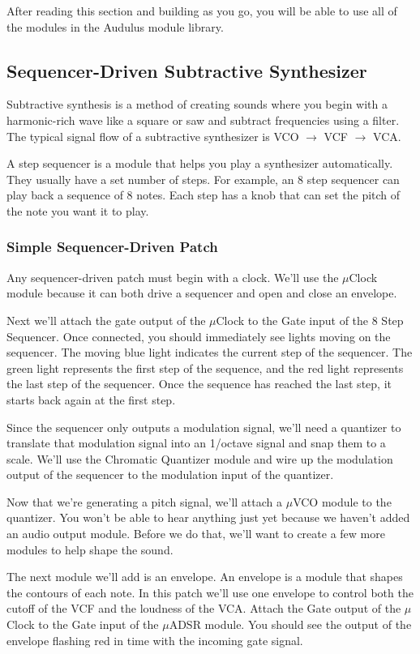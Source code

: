 \documentclass[11pt]{book}
\begin{document}
\begin{multicols*}{2}
After reading this section and building as you go, you will be able to use all of the modules in the Audulus module library. 

\subsection{Sequencer-Driven Subtractive Synthesizer}

Subtractive synthesis is a method of creating sounds where you begin with a harmonic-rich wave like a square or saw and subtract frequencies using a filter. The typical signal flow of a subtractive synthesizer is VCO $\rightarrow$ VCF $\rightarrow$ VCA.

A step sequencer is a module that helps you play a synthesizer automatically. They usually have a set number of steps. For example, an 8 step sequencer can play back a sequence of 8 notes. Each step has a knob that can set the pitch of the note you want it to play. 

\subsubsection{Simple Sequencer-Driven Patch}

Any sequencer-driven patch must begin with a clock. We'll use the $\mu$Clock module because it can both drive a sequencer and open and close an envelope.

Next we'll attach the gate output of the $\mu$Clock to the Gate input of the 8 Step Sequencer. Once connected, you should immediately see lights moving on the sequencer. The moving blue light indicates the current step of the sequencer. The green light represents the first step of the sequence, and the red light represents the last step of the sequencer. Once the sequence has reached the last step, it starts back again at the first step.

Since the sequencer only outputs a modulation signal, we'll need a quantizer to translate that modulation signal into an 1/octave signal and snap them to a scale. We'll use the Chromatic Quantizer module and wire up the modulation output of the sequencer to the modulation input of the quantizer.

Now that we're generating a pitch signal, we'll attach a $\mu$VCO module to the quantizer. You won't be able to hear anything just yet because we haven't added an audio output module. Before we do that, we'll want to create a few more modules to help shape the sound.

The next module we'll add is an envelope. An envelope is a module that shapes the contours of each note. In this patch we'll use one envelope to control both the cutoff of the VCF and the loudness of the VCA. Attach the Gate output of the $\mu$Clock to the Gate input of the $\mu$ADSR module. You should see the output of the envelope flashing red in time with the incoming gate signal.


\end{multicols*}
\end{document}
